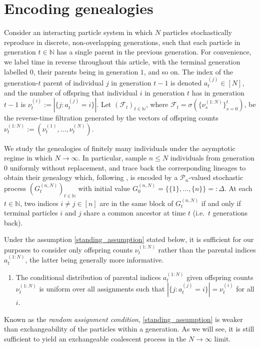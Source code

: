 \documentclass[12pt,authoryear]{article}
\theoremstyle{definition}
\newcommand{\1}[1]{\mathbbm{1}_{#1}}
\begin{document}
\section{Encoding genealogies}

Consider an interacting particle system in which $N$ particles stochastically reproduce in discrete, non-overlapping generations, such that each particle in generation $t \in \mathbb{N}$ has a single parent in the previous generation.
For convenience, we label time in reverse throughout this article, with the terminal generation labelled $0$, their parents being in generation $1$, and so on.
The index of the generation-$t$ parent of individual $j$ in generation $t - 1$ is denoted $a_t^{(j)} \in [N]$, and the number of offspring that individual $i$ in generation $t$ has in generation $t-1$ is $\nu_t^{(i)} := |\{ j: a_t^{(j)} = i \}|$.
Let $(\mathcal{F}_t)_{t\in\mathbb{N}}$, where $\mathcal{F}_t = \sigma(\{\nu_{s}^{(1:N)}\}_{s=0}^t)$, be the reverse-time filtration generated by the vectors of offspring counts $\nu_t^{(1:N)} := ( \nu_t^{(1)}, \ldots, \nu_t^{(N)} )$.

We study the genealogies of finitely many individuals under the asymptotic regime in which $N\to\infty$. In particular, sample $n\leq N$ individuals from generation $0$ uniformly without replacement, and trace back the corresponding lineages to obtain their genealogy which, following \citet{kingman1982coal}, is encoded by a $\mathcal{P}_n$-valued stochastic process $(G_t^{(n,N)})_{t\in\mathbb{N}}$ with initial value $G_0^{(n,N)} = \{ \{1\}, \dots, \{n\} \} =: \Delta $.
At each $t\in\mathbb{N}$, two indices $i\neq j \in [n]$ are in the same block of $G_t^{(n,N)}$ if and only if terminal particles $i$ and $j$ share a common ancestor at time $t$ (i.e.\ $t$ generations back).

Under the assumption \ref{standing_assumption} stated below, it is sufficient for our purposes to consider only offspring counts $\nu_t^{(1:N)}$ rather than the parental indices $a_t^{(1:N)}$, the latter being generally more informative.
\begin{enumerate}[label=(A\arabic*)]
\item\label{standing_assumption} The conditional distribution of parental indices $a_t^{(1:N)}$ given offspring counts $\nu_t^{(1:N)}$ is uniform over all assignments such that $ |\{ j: a_t^{(j)} =i \}|= \nu_t^{(i)} $ for all $i$.
\end{enumerate}
Known as the \emph{random assignment condition},
\ref{standing_assumption} is weaker than exchangeability of the particles within a generation.
As we will see, it is still sufficient to yield an exchangeable coalescent process in the $N \to \infty$ limit.
\end{document}
